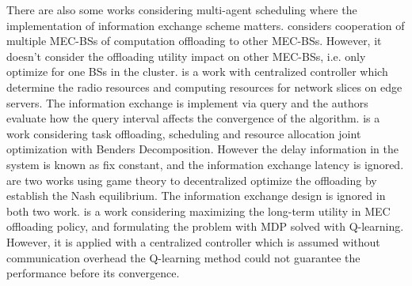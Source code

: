 There are also some works considering multi-agent scheduling where the implementation of information exchange scheme matters.
\cite{Fan2017} considers cooperation of multiple MEC-BSs of computation offloading to other MEC-BSs. However, it doesn't consider the offloading utility impact on other MEC-BSs, i.e. only optimize for one BSs in the cluster.
\cite{MOBIHOC19-LiuQ} is a work with centralized controller which determine the radio resources and computing resources for network slices on edge servers.
The information exchange is implement via query and the authors evaluate how the query interval affects the convergence of the algorithm.
\cite{JSAC19-AlameddineHA} is a work considering task offloading, scheduling and resource allocation joint optimization with Benders Decomposition.
However the delay information in the system is known as fix constant, and the information exchange latency is ignored.
\cite{ACCESS18-ZhangJ,TON18-YangL} are two works using game theory to decentralized optimize the offloading by establish the Nash equilibrium. The information exchange design is ignored in both two work.
\cite{ACCESS19-ZhengX} is a work considering maximizing the long-term utility in MEC offloading policy, and formulating the problem with MDP solved with Q-learning.
However, it is applied with a centralized controller which is assumed without communication overhead the Q-learning method could not guarantee the performance before its convergence.

